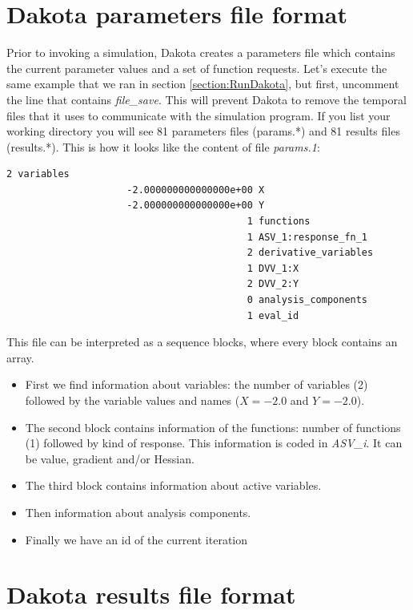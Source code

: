 \documentclass[12pt,a4paper,article]{memoir}
\begin{document}
\section{Dakota parameters file format}

Prior to invoking a simulation, Dakota creates a parameters file which contains the current parameter values and a set of function requests. Let's execute the same example that we ran in section \ref{section:RunDakota}, but first, uncomment the line that contains \textit{file\_save}. This will prevent Dakota to remove the temporal files that it uses to communicate with the simulation program. If you list your working directory you will see 81 parameters files (params.*) and 81 results files (results.*). This is how it looks like the content of file \textit{params.1}:

\begin{lstlisting}[style=MyCodeStyle,language=bash]
                                          2 variables
                     -2.000000000000000e+00 X
                     -2.000000000000000e+00 Y
                                          1 functions
                                          1 ASV_1:response_fn_1
                                          2 derivative_variables
                                          1 DVV_1:X
                                          2 DVV_2:Y
                                          0 analysis_components
                                          1 eval_id
\end{lstlisting}

This file can be interpreted as a sequence blocks, where every block contains an array.
\begin{itemize}
\item First we find information about variables: the number of variables (2) followed by the variable values and names ($X=-2.0$ and $Y=-2.0$).
\item The second block contains information of the functions: number of functions (1) followed by kind of response. This information is coded in \textit{ASV\_i}. It can be value, gradient and/or Hessian.
\item The third block contains information about active variables.
\item Then information about analysis components.
\item Finally we have an id of the current iteration 
\end{itemize}

\section{Dakota results file format}
\end{document}
